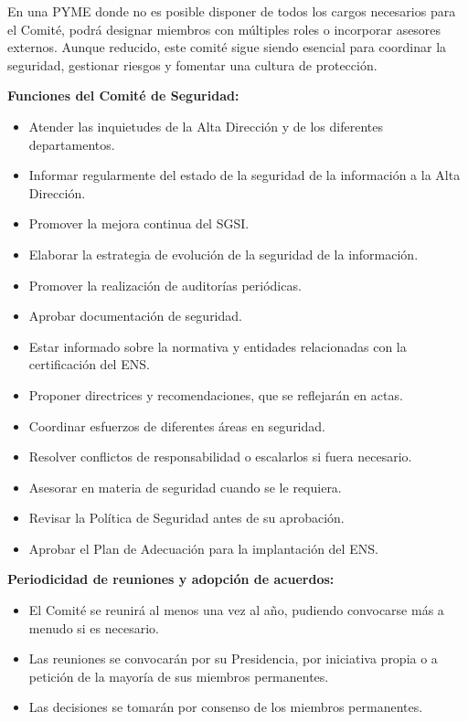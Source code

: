 \begin{enumerate}[label=\alph*)]
En una PYME donde no es posible disponer de todos los cargos necesarios para el Comit\'e, \Beneficiario{} podr\'a designar miembros con m\'ultiples roles o incorporar asesores externos. Aunque reducido, este comit\'e sigue siendo esencial para coordinar la seguridad, gestionar riesgos y fomentar una cultura de protecci\'on.

\textbf{Funciones del Comit\'e de Seguridad:}
\begin{itemize}
  \item Atender las inquietudes de la Alta Direcci\'on y de los diferentes departamentos.
  \item Informar regularmente del estado de la seguridad de la informaci\'on a la Alta Direcci\'on.
  \item Promover la mejora continua del SGSI.
  \item Elaborar la estrategia de evoluci\'on de la seguridad de la informaci\'on.
  \item Promover la realizaci\'on de auditor\'ias peri\'odicas.
  \item Aprobar documentaci\'on de seguridad.
  \item Estar informado sobre la normativa y entidades relacionadas con la certificaci\'on del ENS.
  \item Proponer directrices y recomendaciones, que se reflejar\'an en actas.
  \item Coordinar esfuerzos de diferentes \'{a}reas en seguridad.
  \item Resolver conflictos de responsabilidad o escalarlos si fuera necesario.
  \item Asesorar en materia de seguridad cuando se le requiera.
  \item Revisar la Pol\'itica de Seguridad antes de su aprobaci\'on.
  \item Aprobar el Plan de Adecuaci\'on para la implantaci\'on del ENS.
\end{itemize}

\textbf{Periodicidad de reuniones y adopci\'on de acuerdos:}
\begin{itemize}
  \item El Comit\'e se reunir\'a al menos una vez al a\~no, pudiendo convocarse m\'as a menudo si es necesario.
  \item Las reuniones se convocar\'an por su Presidencia, por iniciativa propia o a petici\'on de la mayor\'ia de sus miembros permanentes.
  \item Las decisiones se tomar\'an por consenso de los miembros permanentes.
\end{itemize}


\end{enumerate}
